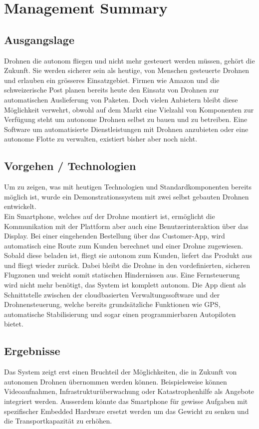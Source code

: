 \newpage
{}
\chapter*{Management Summary}
\section*{Ausgangslage}
Drohnen die autonom fliegen und nicht mehr gesteuert werden müssen, gehört die Zukunft. Sie werden sicherer sein als heutige, von Menschen gesteuerte Drohnen und erlauben ein grösseres Einsatzgebiet. Firmen wie Amazon und die schweizerische Post planen bereits heute den Einsatz von Drohnen zur automatischen Auslieferung von Paketen. Doch vielen Anbietern bleibt diese Möglichkeit verwehrt, obwohl auf dem Markt eine Vielzahl von Komponenten zur Verfügung steht um autonome Drohnen selbst zu bauen und zu betreiben. Eine Software um automatisierte Dienstleistungen mit Drohnen anzubieten oder eine autonome Flotte zu verwalten, existiert bisher aber noch nicht.

\section*{Vorgehen / Technologien}
Um zu zeigen, was mit heutigen Technologien und Standardkomponenten bereits möglich ist, wurde ein Demonstrationssystem mit zwei selbst gebauten Drohnen entwickelt. \\

Ein Smartphone, welches auf der Drohne montiert ist, ermöglicht die Kommunikation mit der Plattform aber auch eine Benutzerinteraktion über das Display. Bei einer eingehenden Bestellung über das Customer-App, wird automatisch eine Route zum Kunden berechnet und einer Drohne zugewiesen. Sobald diese beladen ist, fliegt sie autonom zum Kunden, liefert das Produkt aus und fliegt wieder zurück. Dabei bleibt die Drohne in den vordefinierten, sicheren Flugzonen und weicht somit statischen Hindernissen aus. Eine Fernsteuerung wird nicht mehr benötigt, das System ist komplett autonom. Die App dient als Schnittstelle zwischen der cloudbasierten Verwaltungssoftware und der Drohnensteuerung, welche bereits grundsätzliche Funktionen wie GPS, automatische Stabilisierung und sogar einen programmierbaren Autopiloten bietet.

\section*{Ergebnisse}
Das System zeigt erst einen Bruchteil der Möglichkeiten, die in Zukunft von autonomen Drohnen übernommen werden können. Beispielsweise können Videoaufnahmen, Infrastrukturüberwachung oder Katastrophenhilfe als Angebote integriert werden. Ausserdem könnte das Smartphone für gewisse Aufgaben mit spezifischer Embedded Hardware ersetzt werden um das Gewicht zu senken und die Transportkapazität zu erhöhen. \\

